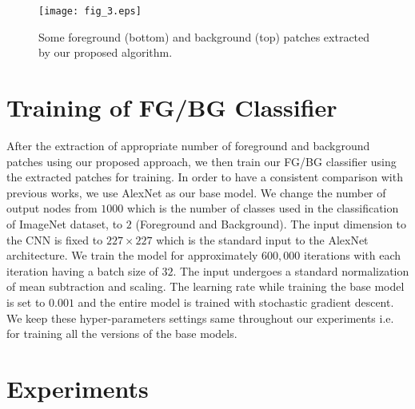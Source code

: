\documentclass[10pt,twocolumn,letterpaper]{article}
\begin{document}
\begin{figure*}[!t]
\centering
\texttt{[image: fig\_3.eps]}
\caption{Some foreground (bottom) and background (top) patches extracted by our proposed algorithm.}
\label{fig: fg/bg patch sample}
\end{figure*}


\section{Training of FG/BG Classifier}
After the extraction of appropriate number of foreground and background patches using our proposed approach, we then train our FG/BG classifier using the extracted patches for training. In order to have a consistent comparison with previous works, we use AlexNet \cite{krizhevsky2012imagenet} as our base model. We change the number of output nodes from $1000$ which is the number of classes used in the classification of ImageNet \cite{deng2009imagenet} dataset, to $2$ (Foreground and Background). The input dimension to the CNN is fixed to $227 \times 227$ which is the standard input to the AlexNet architecture. We train the model for approximately $600,000$ iterations with each iteration having a batch size of $32$. The input undergoes a standard normalization of mean subtraction and scaling. The learning rate while training the base model is set to $0.001$ and the entire model is trained with stochastic gradient descent. We keep these hyper-parameters settings same throughout our experiments i.e. for training all the versions of the base models.

\section{Experiments}
\end{document}
